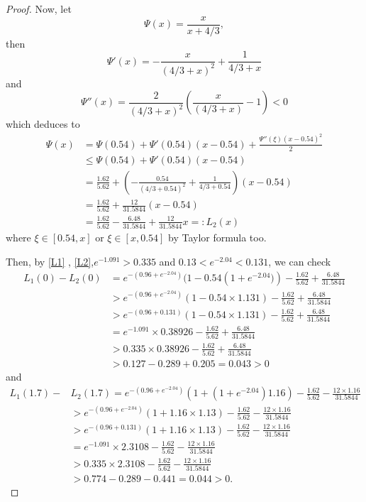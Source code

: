 \documentclass{HZNUMCM}
\begin{document}
\begin{proof}
Now, let
$$
\Psi(x)=\frac x {x+4/3},
$$then
$$
\Psi'(x)=-\frac{x}{(4/3 +x)^2}+\frac{1}{4/3 +x}
$$
and
$$
\Psi''(x)=\frac{2}{( 4/3+x)^2}\left(\frac{x}{(4/3+x)}-1\right)<0
$$
which deduces to
\begin{equation}\label{L2}
\begin{split}
\Psi(x)&=\Psi(0.54)+\Psi'(0.54)(x-0.54)+\frac{\Psi''(\xi)(x-0.54)^2}2\\
&\leqslant \Psi(0.54)+\Psi'(0.54)(x-0.54)\\
&=\frac{1.62}{5.62}+\left(-\frac{0.54}{(4/3 +0.54)^2}+\frac{1}{4/3 +0.54}\right)(x-0.54)\\
&=\frac{1.62}{5.62}+\frac{12}{31.5844}(x-0.54)\\
&=\frac{1.62}{5.62}-\frac{6.48}{31.5844}+\frac{12}{31.5844}x=:L_2(x)
\end{split}
\end{equation}where $\xi\in[0.54,x] \text{~or~} \xi\in[x,0.54]$
by Taylor formula too.

Then, by \eqref{L1} , \eqref{L2},$e^{-1.091}>0.335$ and  $0.13<e^{-2.04}<0.131$,  we can check
\begin{align*}
L_1(0)-L_2(0)&=e^{-(0.96 + e^{-2.04} )}(1-0.54 \left(1+e^{-2.04})\right)-\frac{1.62}{5.62}+\frac{6.48}{31.5844}\\
&> e^{-(0.96 + e^{-2.04} )}(1-0.54 \times 1.131)-\frac{1.62}{5.62}+\frac{6.48}{31.5844}\\
&> e^{-(0.96 +0.131 )}(1-0.54 \times 1.131)-\frac{1.62}{5.62}+\frac{6.48}{31.5844}\\
&= e^{-1.091}\times0.38926 -\frac{1.62}{5.62}+\frac{6.48}{31.5844}\\
&> 0.335\times 0.38926 -\frac{1.62}{5.62}+\frac{6.48}{31.5844}\\
&> 0.127-0.289+0.205=0.043>0
\end{align*}
and
\begin{align*}
L_1(1.7)-&L_2(1.7)=e^{-(0.96 + e^{-2.04} )}(1+ \left(1+e^{-2.04}\right)1.16)-\frac{1.62}{5.62}-\frac{12\times 1.16}{31.5844}\\
&> e^{-(0.96 + e^{-2.04} )}(1+1.16 \times 1.13)-\frac{1.62}{5.62}-\frac{12\times 1.16}{31.5844}\\
&> e^{-(0.96 +0.131 )}(1+1.16 \times 1.13)-\frac{1.62}{5.62}-\frac{12\times 1.16}{31.5844}\\
&= e^{-1.091}\times 2.3108-\frac{1.62}{5.62}-\frac{12\times 1.16}{31.5844}\\
&> 0.335\times2.3108-\frac{1.62}{5.62}-\frac{12\times 1.16}{31.5844}\\
&> 0.774-0.289-0.441=0.044>0.
\end{align*}


\end{proof}
\end{document}
